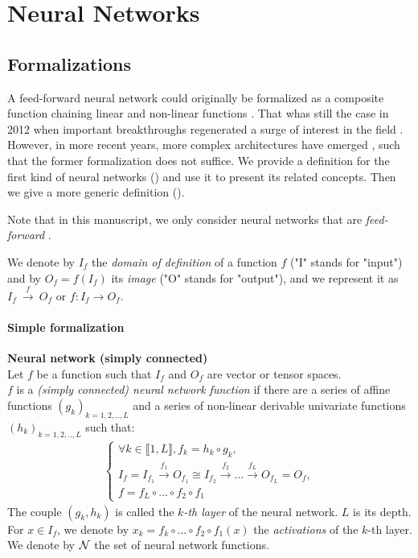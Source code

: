 \section{Neural Networks}
\label{sec:nn}

\subsection{Formalizations}

A feed-forward neural network could originally be formalized as a composite function chaining linear and non-linear functions \citep{rumelhart1985learning,lecun1989backpropagation,lecun1995convolutional}. That whas still the case in 2012 when important breakthroughs regenerated a surge of interest in the field \citep{hinton2012deep,krizhevsky2012imagenet,simonyan2014very}. However, in more recent years, more complex architectures have emerged \citep{szegedy2015going,he2016deep,zoph2016neural,huang2017densely}, such that the former formalization does not suffice. We provide a definition for the first kind of neural networks () and use it to present its related concepts. Then we give a more generic definition ().

Note that in this manuscript, we only consider neural networks that are \emph{feed-forward} \citep{zell1994simulation, wiki:fnn}.

We denote by $I_f$ the \textit{domain of definition} of a function $f$ ("I" stands for "input") and by $O_f = f(I_f)$ its \textit{image} ("O" stands for "output"), and we represent it as $I_f~\xrightarrow{f}~O_f$ or $f: I_f \to O_f$.

\paragraph{Simple formalization}
\begin{definition}\textbf{Neural network (simply connected)}\\
Let $f$ be a function such that $I_f$ and $O_f$ are vector or tensor spaces.\\
$f$ is a \emph{(simply connected) neural network function} if there are a series of affine functions $(g_k)_{k=1,2,..,L}$ and a series of non-linear derivable univariate functions $(h_k)_{k=1,2,..,L}$ such that:
\begin{gather*}
\left\{
  \begin{array}{l}
    \forall k \in \llbracket 1, L \rrbracket, f_k = h_k \circ g_k, \\
    I_f = I_{f_1} \xrightarrow{f_1} O_{f_1} \cong I_{f_2} \xrightarrow{f_2} \dots \xrightarrow{f_L} O_{f_L} = O_f, \\
    f = f_{L} \circ ... \circ f_{2} \circ f_1
  \end{array}
\right.
\end{gather*}
The couple $(g_k, h_k)$ is called the \emph{$k$-th layer} of the neural network. $L$ is its depth.
For $x \in I_f$, we denote by $x_k = f_k \circ ... \circ f_{2} \circ f_1 (x)$ the \emph{activations} of the $k$-th layer. We denote by $\mathcal{N}$ the set of neural network functions.
\label{def:nn}
\end{definition}

